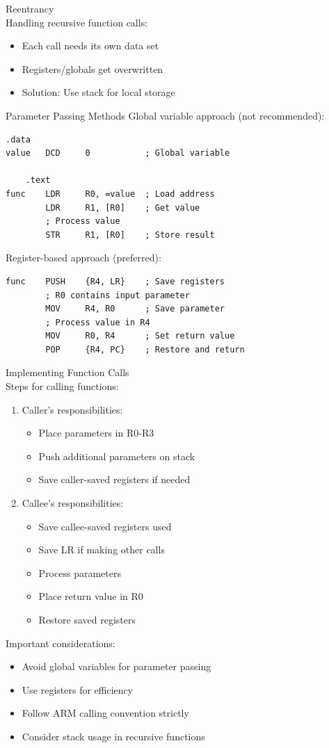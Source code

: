 \begin{concept}{Reentrancy}\\
Handling recursive function calls:
\begin{itemize}
  \item Each call needs its own data set
  \item Registers/globals get overwritten
  \item Solution: Use stack for local storage
\end{itemize}
\end{concept}

\begin{example2}{Parameter Passing Methods}
Global variable approach (not recommended):
\begin{lstlisting}[language=armasm, style=basesmol]
    .data
value   DCD     0           ; Global variable

    .text
func    LDR     R0, =value  ; Load address
        LDR     R1, [R0]    ; Get value
        ; Process value
        STR     R1, [R0]    ; Store result
\end{lstlisting}

Register-based approach (preferred):
\begin{lstlisting}[language=armasm, style=basesmol]
func    PUSH    {R4, LR}    ; Save registers
        ; R0 contains input parameter
        MOV     R4, R0      ; Save parameter
        ; Process value in R4
        MOV     R0, R4      ; Set return value
        POP     {R4, PC}    ; Restore and return
\end{lstlisting}
\end{example2}

\begin{KR}{Implementing Function Calls}\\
Steps for calling functions:
\begin{enumerate}
  \item Caller's responsibilities:
    \begin{itemize}
      \item Place parameters in R0-R3
      \item Push additional parameters on stack
      \item Save caller-saved registers if needed
    \end{itemize}
  \item Callee's responsibilities:
    \begin{itemize}
      \item Save callee-saved registers used
      \item Save LR if making other calls
      \item Process parameters
      \item Place return value in R0
      \item Restore saved registers
    \end{itemize}
\end{enumerate}
\end{KR}

\begin{remark}
Important considerations:
\begin{itemize}
  \item Avoid global variables for parameter passing
  \item Use registers for efficiency
  \item Follow ARM calling convention strictly
  \item Consider stack usage in recursive functions
\end{itemize}
\end{remark}
